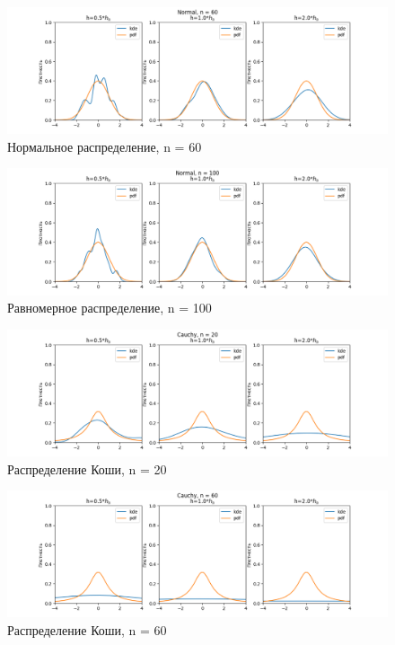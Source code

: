 \documentclass[12pt]{article}
\begin{document}
\begin{figure}[h!]
  \centering
  \includegraphics[width=0.8\paperwidth ]{images/kde/Normal_60.png}
  \caption{Нормальное распределение, n = 60}
\end{figure}

\begin{figure}[ht]
  \centering
  \includegraphics[width=0.8\paperwidth ]{images/kde/Normal_100.png}
  \caption{Равномерное распределение, n = 100}
\end{figure}

\begin{figure}
  \centering
  \includegraphics[width=0.8\paperwidth ]{images/kde/Cauchy_20.png}
  \caption{Распределение Коши, n = 20}
\end{figure}

\begin{figure}
  \centering
  \includegraphics[width=0.8\paperwidth ]{images/kde/Cauchy_60.png}
  \caption{Распределение Коши, n = 60}
\end{figure}
\end{document}
